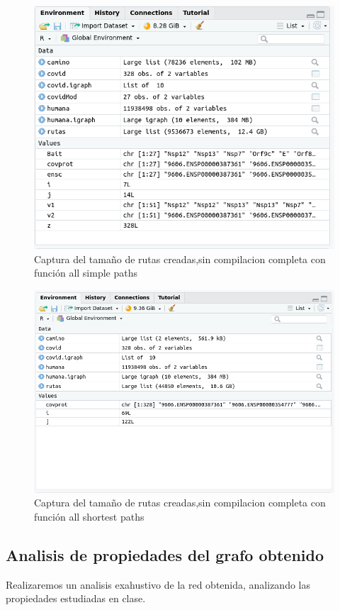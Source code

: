 \begin{figure}[ht!]
	\centering
	\includegraphics[scale = 0.3]{figures/allSimplePathTodos.png}
	\caption{Captura del tamaño de rutas creadas,sin compilacion completa con función all simple paths}
\end{figure}

\begin{figure}[ht!]
	\centering
	\includegraphics[scale = 0.3]{figures/allShortestPathTodos.png}
	\caption{Captura del tamaño de rutas creadas,sin compilacion completa con función all shortest paths}
\end{figure}



\subsection{Analisis de propiedades del grafo obtenido}
Realizaremos un analisis exahustivo de la red obtenida, analizando las propiedades estudiadas en clase.

